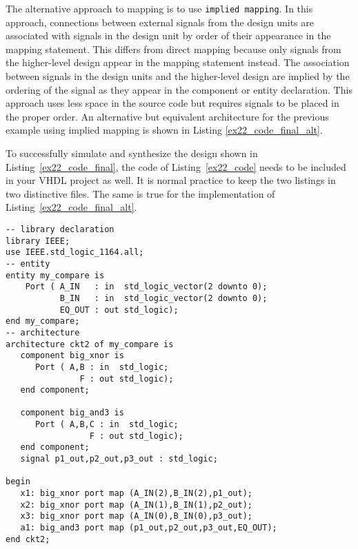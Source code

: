 The alternative approach to mapping is to use \texttt{implied mapping}. In this approach, connections between external signals from the design units are associated with signals in the design unit by order of their appearance in the mapping statement. This differs from direct mapping because only signals from the higher-level design appear in the mapping statement instead. The association between signals in the design units and the higher-level design are implied by the ordering of the signal as they appear in the component or entity declaration. This approach uses less space in the source code but requires signals to be placed in the proper order. An alternative but equivalent architecture for the previous example using implied mapping is shown in Listing \ref{ex22_code_final_alt}. 

To successfully simulate and synthesize the design shown in Listing~\ref{ex22_code_final}, the code of Listing~\ref{ex22_code} needs to be included in your VHDL project as well. It is normal practice to keep the two listings in two distinctive files. The same is true for the implementation of Listing~\ref{ex22_code_final_alt}.

\noindent
\begin{minipage}{0.99\linewidth}
\begin{lstlisting}[label=ex22_code_final_alt, caption=Alternative architecture for Example 22 using implied mapping.]
-- library declaration
library IEEE;
use IEEE.std_logic_1164.all;
-- entity
entity my_compare is
    Port ( A_IN   : in  std_logic_vector(2 downto 0);
           B_IN   : in  std_logic_vector(2 downto 0);
           EQ_OUT : out std_logic);
end my_compare;
-- architecture
architecture ckt2 of my_compare is 
   component big_xnor is
      Port ( A,B : in  std_logic;
               F : out std_logic);
   end component;

   component big_and3 is
      Port ( A,B,C : in  std_logic;
                 F : out std_logic);
   end component;
   signal p1_out,p2_out,p3_out : std_logic; 

begin
   x1: big_xnor port map (A_IN(2),B_IN(2),p1_out); 
   x2: big_xnor port map (A_IN(1),B_IN(1),p2_out); 
   x3: big_xnor port map (A_IN(0),B_IN(0),p3_out);   
   a1: big_and3 port map (p1_out,p2_out,p3_out,EQ_OUT); 
end ckt2;
\end{lstlisting}
\end{minipage}


